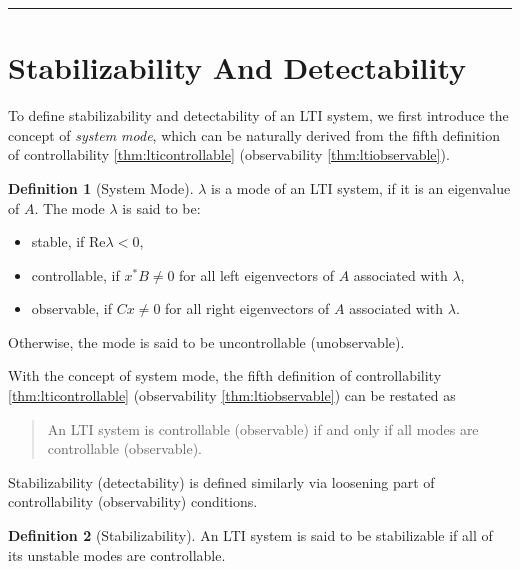 \documentclass[
]{book}
\providecommand{\tightlist}{%
  \setlength{\itemsep}{0pt}\setlength{\parskip}{0pt}}
\theoremstyle{definition}
\newtheorem{definition}{Definition}[chapter]
\theoremstyle{definition}
\theoremstyle{definition}
\theoremstyle{definition}
\theoremstyle{remark}
\begin{document}
\begin{center}\rule{0.5\linewidth}{0.5pt}\end{center}

\section{Stabilizability And Detectability}\label{stabilizability-and-detectability}

To define stabilizability and detectability of an LTI system, we first introduce the concept of \emph{system mode}, which can be naturally derived from the fifth definition of controllability \ref{thm:lticontrollable} (observability \ref{thm:ltiobservable}).

\begin{definition}[System Mode]
\protect\hypertarget{def:ltisystemmode}{}\label{def:ltisystemmode}\(\lambda\) is a mode of an LTI system, if it is an eigenvalue of \(A\). The mode \(\lambda\) is said to be:

\begin{itemize}
\tightlist
\item
  stable, if \(\text{Re}\lambda < 0\),
\item
  controllable, if \(x^* B \ne 0\) for all left eigenvectors of \(A\) associated with \(\lambda\),
\item
  observable, if \(C x \ne 0\) for all right eigenvectors of \(A\) associated with \(\lambda\).
\end{itemize}

Otherwise, the mode is said to be uncontrollable (unobservable).
\end{definition}

With the concept of system mode, the fifth definition of controllability \ref{thm:lticontrollable} (observability \ref{thm:ltiobservable}) can be restated as

\begin{quote}
An LTI system is controllable (observable) if and only if all modes are controllable (observable).
\end{quote}

Stabilizability (detectability) is defined similarly via loosening part of controllability (observability) conditions.

\begin{definition}[Stabilizability]
\protect\hypertarget{def:ltistabilizable}{}\label{def:ltistabilizable}An LTI system is said to be stabilizable if all of its unstable modes are controllable.
\end{definition}
\end{document}

